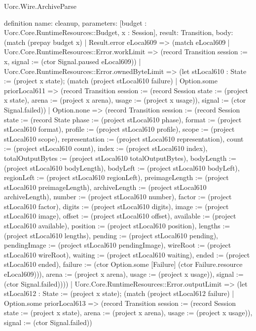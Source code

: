 \begin{lexlean}{Uorc.Wire.ArchiveParse}
\begin{semanticmodule}
definition{
  name: cleanup,
  parameters: [budget : Uorc.Core.RuntimeResources::Budget, x : Session],
  result: Transition,
  body: (match (prepay budget x)
    | Result.error eLocal609 => (match eLocal609
      | Uorc.Core.RuntimeResources::Error.workLimit => (record Transition {session := x, signal := (ctor Signal.paused eLocal609)})
      | Uorc.Core.RuntimeResources::Error.ownedByteLimit => (let stLocal610 : State := (project x state); (match (project stLocal610 failure)
        | Option.some priorLocal611 => (record Transition {session := (record Session {state := (project x state), arena := (project x arena), usage := (project x usage)}), signal := (ctor Signal.failed)})
        | Option.none => (record Transition {session := (record Session {state := (record State {phase := (project stLocal610 phase), format := (project stLocal610 format), profile := (project stLocal610 profile), scope := (project stLocal610 scope), representation := (project stLocal610 representation), count := (project stLocal610 count), index := (project stLocal610 index), totalOutputBytes := (project stLocal610 totalOutputBytes), bodyLength := (project stLocal610 bodyLength), bodyLeft := (project stLocal610 bodyLeft), regionLeft := (project stLocal610 regionLeft), preimageLength := (project stLocal610 preimageLength), archiveLength := (project stLocal610 archiveLength), number := (project stLocal610 number), factor := (project stLocal610 factor), digits := (project stLocal610 digits), image := (project stLocal610 image), offset := (project stLocal610 offset), available := (project stLocal610 available), position := (project stLocal610 position), lengths := (project stLocal610 lengths), pending := (project stLocal610 pending), pendingImage := (project stLocal610 pendingImage), wireRoot := (project stLocal610 wireRoot), waiting := (project stLocal610 waiting), ended := (project stLocal610 ended), failure := (ctor Option.some [Failure] (ctor Failure.resource eLocal609))}), arena := (project x arena), usage := (project x usage)}), signal := (ctor Signal.failed)})))
      | Uorc.Core.RuntimeResources::Error.outputLimit => (let stLocal612 : State := (project x state); (match (project stLocal612 failure)
        | Option.some priorLocal613 => (record Transition {session := (record Session {state := (project x state), arena := (project x arena), usage := (project x usage)}), signal := (ctor Signal.failed)})
}
\end{semanticmodule}
\end{lexlean}
